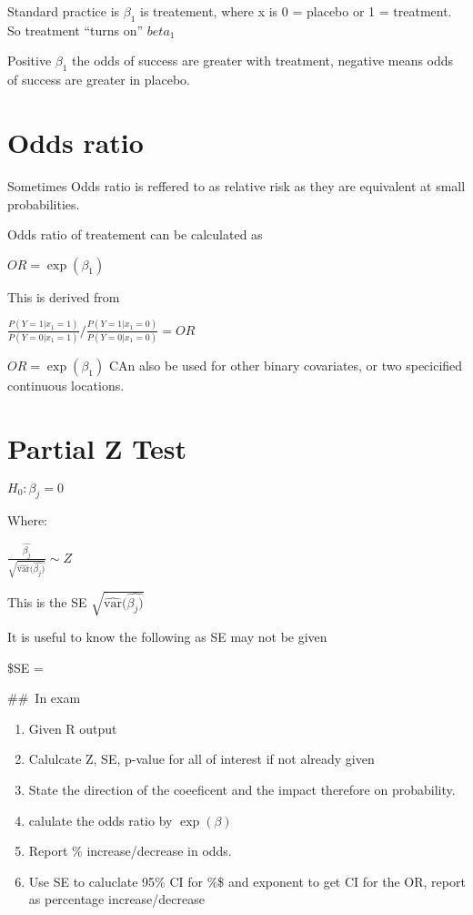 \documentclass[
  letterpaper,
  DIV=11,
  numbers=noendperiod]{scrreprt}
\providecommand{\tightlist}{%
  \setlength{\itemsep}{0pt}\setlength{\parskip}{0pt}}\usepackage{longtable,booktabs,array}
\begin{document}
Standard practice is \(\beta_1\) is treatement, where x is 0 = placebo
or 1 = treatment. So treatment ``turns on'' \(beta_1\)

Positive \(\beta_1\) the odds of success are greater with treatment,
negative means odds of success are greater in placebo.

\hypertarget{odds-ratio}{%
\section{Odds ratio}\label{odds-ratio}}

Sometimes Odds ratio is reffered to as relative risk as they are
equivalent at small probabilities.

Odds ratio of treatement can be calculated as

\(OR = \exp(\beta_1)\)

This is derived from

\(\frac{P(Y=1|x_1 = 1)}{P(Y=0|x_1 = 1)}/ \frac{P(Y=1|x_1 = 0)}{P(Y=0|x_1 = 0)} = OR\)

\(OR = \exp(\beta_1)\) CAn also be used for other binary covariates, or
two specicified continuous locations.

\hypertarget{partial-z-test}{%
\section{Partial Z Test}\label{partial-z-test}}

\(H_0 : \beta_j = 0\)

Where:

\(\frac{\hat{\beta_j}}{  \sqrt{  \hat{\text{var}}(\hat{\beta_j)}  } } \sim Z\)

This is the SE \(\sqrt{\hat{\text{var}}(\hat{\beta_j)}}\)

It is useful to know the following as SE may not be given

\$SE = 

\#\#~In exam

\begin{enumerate}
\def\labelenumi{\arabic{enumi})}
\tightlist
\item
  Given R output
\item
  Calulcate Z, SE, p-value for all of interest if not already given
\item
  State the direction of the coeeficent and the impact therefore on
  probability.
\item
  calulate the odds ratio by \(\exp(\beta)\)
\item
  Report \% increase/decrease in odds.
\item
  Use SE to caluclate 95\% CI for \%\beta\$ and exponent to get CI for
  the OR, report as percentage increase/decrease
\end{enumerate}
\end{document}
